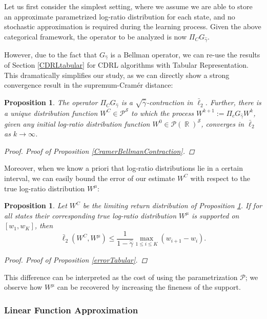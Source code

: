 \documentclass[12pt,a4paper,openright,twoside]{article}
\DeclareMathOperator*{\R}{\mathbb{R}}
\DeclareMathOperator*{\Sspace}{\mathcal{S}}
\numberwithin{equation}{section}
\newtheorem{prop}[theorem]{Proposition}
\theoremstyle{definition}
\theoremstyle{remark}
\theoremstyle{plain}
\begin{document}
Let us first consider the simplest setting, where we assume we are able to store an approximate parametrized log-ratio distribution for each state, and no stochastic approximation is required during the learning process. Given the above categorical framework, the operator to be analyzed is now $\Pi_C G_{\hat{\gamma}}$.

However, due to the fact that $G_{\hat{\gamma}}$ is a Bellman operator, we can re-use the results of Section \ref{CDRLtabular} for CDRL algorithms with Tabular Representation. This dramatically simplifies our study, as we can directly show a strong convergence result in the supremum-Cramér distance:

\begin{prop} \label{CramerBellmanContractionG}
	The operator $\Pi_C G_{\hat{\gamma}}$ is a $\sqrt{\hat{\gamma}}$-contraction in $\bar{\ell}_2$. Further, there is a unique distribution function $W^C \in \mathcal{P}^{\Sspace}$ to which the process $W^{k+1} := \Pi_c G_{\hat{\gamma}} W^k$, given any initial log-ratio distribution function $W^0 \in \mathscr{P}(\R)^{\Sspace}$, converges in $\bar{\ell}_2$ as $k \rightarrow \infty$.
	\begin{proof}
		Proof of Proposition \ref{CramerBellmanContraction}.
	\end{proof}
\end{prop}

Moreover, when we know a priori that log-ratio distributions lie in a certain interval, we can easily bound the error of our estimate $W^C$ with respect to the true log-ratio distribution $W^\mu$:

\begin{prop} \label{errorTabularG}
	Let $W^C$ be the limiting return distribution of Proposition \ref{CramerBellmanContractionG}. If for all states their corresponding true log-ratio distribution $W^\mu$ is supported on $[w_1,w_K]$, then 
	$$\bar{\ell}_2(W^C, W^\mu) \leq \frac{1}{1-\hat{\gamma}} \max_{1\leq i \leq K} (w_{i+1}-w_i). $$
	\begin{proof}
		Proof of Proposition \ref{errorTabular}.
	\end{proof}
\end{prop}

This difference can be interpreted as the cost of using the parametrization $\mathcal{P}$; we observe how $W^\mu$ can be recovered by increasing the fineness of the support.





\subsubsection{Linear Function Approximation}
\end{document}
